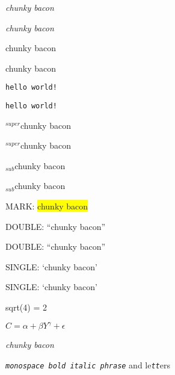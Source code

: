 
\emph{chunky bacon}

\emph{chunky bacon}

chunky bacon

chunky bacon

{\tt hello world!}

{\tt hello world!}

${}^{super}$chunky bacon

${}^{super}$chunky bacon

${}_{sub}$chunky bacon

${}_{sub}$chunky bacon

MARK: \colorbox{yellow}{ chunky bacon}

DOUBLE: ``chunky bacon''

DOUBLE: ``chunky bacon''

SINGLE: `chunky bacon'

SINGLE: `chunky bacon'

sqrt(4) = 2

$C = \alpha + \beta Y^{\gamma} + \epsilon$

\emph{chunky bacon}

{\tt \emph{monospace bold italic phrase}} and le{\tt \emph{tt}}ers
